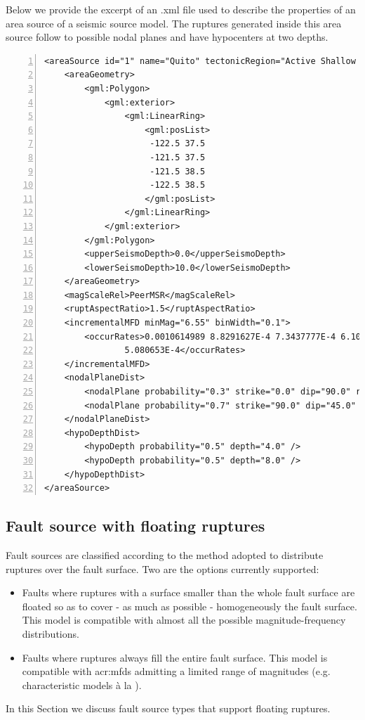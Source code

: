 Below we provide the excerpt of an .xml file used to describe the 
properties of an area source of a seismic source model.
The ruptures generated inside this area source follow to possible nodal 
planes and have hypocenters at two depths. 
\begin{Verbatim}[frame=single, commandchars=\\\{\}, fontsize=\footnotesize,
numbers=left, numbersep=2pt]
<areaSource id="1" name="Quito" tectonicRegion="Active Shallow Crust">
    <areaGeometry>
        <gml:Polygon>
            <gml:exterior>
                <gml:LinearRing>
                    <gml:posList>
                     -122.5 37.5
                     -121.5 37.5
                     -121.5 38.5
                     -122.5 38.5
                    </gml:posList>
                </gml:LinearRing>
            </gml:exterior>
        </gml:Polygon>
        <upperSeismoDepth>0.0</upperSeismoDepth>
        <lowerSeismoDepth>10.0</lowerSeismoDepth>
    </areaGeometry>
    <magScaleRel>PeerMSR</magScaleRel>
    <ruptAspectRatio>1.5</ruptAspectRatio>
    <incrementalMFD minMag="6.55" binWidth="0.1">
        <occurRates>0.0010614989 8.8291627E-4 7.3437777E-4 6.108288E-4 
				5.080653E-4</occurRates>
    </incrementalMFD>
    <nodalPlaneDist>
        <nodalPlane probability="0.3" strike="0.0" dip="90.0" rake="0.0"/>
        <nodalPlane probability="0.7" strike="90.0" dip="45.0" rake="90.0"/>
    </nodalPlaneDist>
    <hypoDepthDist>
        <hypoDepth probability="0.5" depth="4.0" />
        <hypoDepth probability="0.5" depth="8.0" />
    </hypoDepthDist>
</areaSource>
\end{Verbatim}
%
\subsection{Fault source with floating ruptures}
%
Fault sources are classified according to the method adopted to 
distribute ruptures over the fault surface. Two are the options 
currently supported: 
\begin{itemize}
    \item Faults where ruptures with a surface smaller than the 
        whole fault surface are floated so as to cover - as much 
        as possible - homogeneously the fault surface.
        This model is compatible with almost all the possible 
        magnitude-frequency distributions.
    \item Faults where ruptures always fill the entire fault 
        surface. This model is compatible with \glspl{acr:mfd} 
        admitting a limited range of magnitudes (e.g. characteristic 
        models \`{a} la \cite{schwartz1984}).
\end{itemize}
In this Section we discuss fault source types that support floating ruptures.
%
